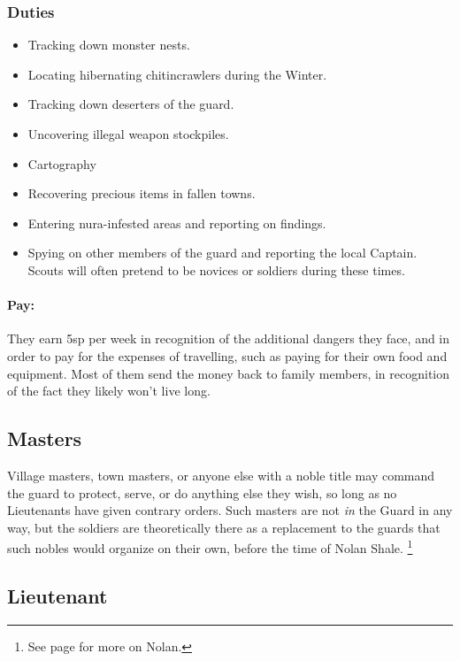 \begin{multicols}{2}
\subsubsection{Duties}

\begin{itemize}
  \item
  Tracking down monster nests.
  \item
  Locating hibernating chitincrawlers during the Winter.
  \item
  Tracking down deserters of the \gls{guard}.
  \item
  Uncovering illegal weapon stockpiles.
  \item
  Cartography
  \item
  Recovering precious items in fallen towns.
  \item
  Entering nura-infested areas and reporting on findings.
  \item
  Spying on other members of the \gls{guard} and reporting the local Captain.
  Scouts will often pretend to be novices or soldiers during these times.
\end{itemize}

\paragraph{Pay:}
They earn 5sp per week in recognition of the additional dangers they face, and in order to pay for the expenses of travelling, such as paying for their own food and equipment.
Most of them send the money back to family members, in recognition of the fact they likely won't live long.

\subsection{Masters}

Village masters, town masters, or anyone else with a noble title may command the \gls{guard} to protect, serve, or do anything else they wish, so long as no Lieutenants have given contrary orders.
Such masters are not \textit{in} the Guard in any way, but the soldiers are theoretically there as a replacement to the guards that such nobles would organize on their own, before the time of Nolan Shale.%
\footnote{See page \pageref{nolan} for more on Nolan.}

\subsection{Lieutenant}


\end{multicols}
